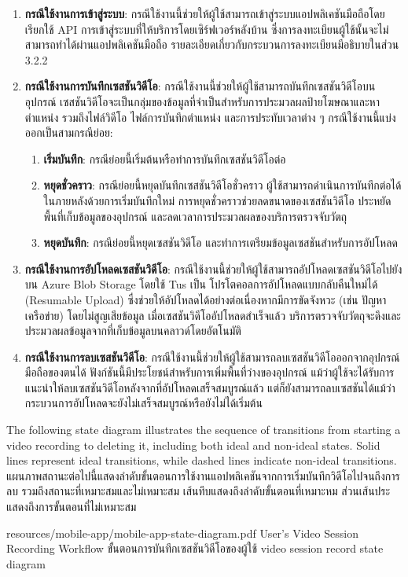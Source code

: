 \else
\begin{enumerate}
    \item \textbf{กรณีใช้งานการเข้าสู่ระบบ}: กรณีใช้งานนี้ช่วยให้ผู้ใช้สามารถเข้าสู่ระบบแอปพลิเคชันมือถือโดยเรียกใช้ API การเข้าสู่ระบบที่ให้บริการโดยเซิร์ฟเวอร์หลังบ้าน ซึ่งการลงทะเบียนผู้ใช้นั้นจะไม่สามารถทำได้ผ่านแอปพลิเคชันมือถือ รายละเอียดเกี่ยวกับกระบวนการลงทะเบียนมีอธิบายในส่วน 3.2.2 %
    \item \textbf{กรณีใช้งานการบันทึกเซสชันวิดีโอ}: กรณีใช้งานนี้ช่วยให้ผู้ใช้สามารถบันทึกเซสชันวิดีโอบนอุปกรณ์ เซสชันวิดีโอจะเป็นกลุ่มของข้อมูลที่จำเป็นสำหรับการประมวลผลป้ายโฆษณาและหาตำแหน่ง รวมถึงไฟล์วิดีโอ  ไฟล์การบันทึกตำแหน่ง และการประทับเวลาต่าง ๆ กรณีใช้งานนี้แบ่งออกเป็นสามกรณีย่อย:
    \begin{enumerate}
        \item \textbf{เริ่มบันทึก}: กรณีย่อยนี้เริ่มต้นหรือทำการบันทึกเซสชันวิดีโอต่อ  
        \item \textbf{หยุดชั่วคราว}: กรณีย่อยนี้หยุดบันทึกเซสชันวิดีโอชั่วคราว ผู้ใช้สามารถดำเนินการบันทึกต่อได้ในภายหลังด้วยการเริ่มบันทึกใหม่ การหยุดชั่วคราวช่วยลดขนาดของเซสชันวิดีโอ ประหยัดพื้นที่เก็บข้อมูลของอุปกรณ์ และลดเวลาการประมวลผลของบริการตรวจจับวัตถุ  
        \item \textbf{หยุดบันทึก}: กรณีย่อยนี้หยุดเซสชันวิดีโอ และทำการเตรียมข้อมูลเซสชันสำหรับการอัปโหลด  
    \end{enumerate}
    \item \textbf{กรณีใช้งานการอัปโหลดเซสชันวิดีโอ}: กรณีใช้งานนี้ช่วยให้ผู้ใช้สามารถอัปโหลดเซสชันวิดีโอไปยังบน Azure Blob Storage โดยใช้ Tus เป็น โปรโตคอลการอัปโหลดแบบกลับคืนใหม่ได้ (Resumable Upload) ซึ่งช่วยให้อัปโหลดได้อย่างต่อเนื่องหากมีการขัดจังหวะ (เช่น ปัญหาเครือข่าย) โดยไม่สูญเสียข้อมูล เมื่อเซสชันวิดีโออัปโหลดสำเร็จแล้ว บริการตรวจจับวัตถุจะดึงและประมวลผลข้อมูลจากที่เก็บข้อมูลบนคลาวด์โดยอัตโนมัติ  
    \item \textbf{กรณีใช้งานการลบเซสชันวิดีโอ}: กรณีใช้งานนี้ช่วยให้ผู้ใช้สามารถลบเซสชันวิดีโอออกจากอุปกรณ์มือถือของตนได้ ฟังก์ชันนี้มีประโยชน์สำหรับการเพิ่มพื้นที่ว่างของอุปกรณ์ แม้ว่าผู้ใช้จะได้รับการแนะนำให้ลบเซสชันวิดีโอหลังจากที่อัปโหลดเสร็จสมบูรณ์แล้ว แต่ก็ยังสามารถลบเซสชันได้แม้ว่ากระบวนการอัปโหลดจะยังไม่เสร็จสมบูรณ์หรือยังไม่ได้เริ่มต้น
\end{enumerate}
\fi

\ifenglish
The following state diagram illustrates the sequence of transitions from starting a video recording to deleting it, including both ideal and non-ideal states. Solid lines represent ideal transitions, while dashed lines indicate non-ideal transitions.
\else
แผนภาพสถานะต่อไปนี้แสดงลำดับขั้นตอนการใช้งานแอปพลิเคชันจากการเริ่มบันทึกวิดีโอไปจนถึงการลบ รวมถึงสถานะที่เหมาะสมและไม่เหมาะสม เส้นทึบแสดงถึงลำดับขั้นตอนที่เหมาะหม ส่วนเส้นประแสดงถึงการขั้นตอนที่ไม่เหมาะสม
\fi

\insertPDFfigure
{resources/mobile-app/mobile-app-state-diagram.pdf}
{\ifenglish User's Video Session Recording Workflow \else ขั้นตอนการบันทึกเซสชันวิดีโอของผู้ใช้ \fi}
{video session record state diagram}